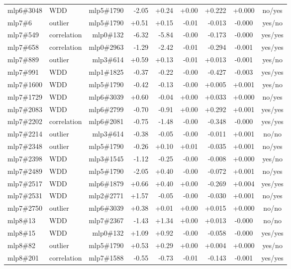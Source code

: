 \begin{center}
\begin{longtable}{llrrrrrcc}
mlp6\#3048 & WDD & mlp5\#1790 & -2.05 & +0.24 & +0.00 & +0.222 & +0.000 & no/yes \\
mlp7\#6 & outlier & mlp5\#1790 & +0.51 & +0.15 & -0.01 & -0.013 & -0.000 & yes/no \\
mlp7\#549 & correlation & mlp0\#132 & -6.32 & -5.84 & -0.00 & -0.173 & -0.000 & yes/yes \\
mlp7\#658 & correlation & mlp0\#2963 & -1.29 & -2.42 & -0.01 & -0.294 & -0.001 & yes/yes \\
mlp7\#889 & outlier & mlp3\#614 & +0.59 & +0.13 & -0.01 & +0.013 & -0.001 & yes/no \\
mlp7\#991 & WDD & mlp1\#1825 & -0.37 & -0.22 & -0.00 & -0.427 & -0.003 & yes/yes \\
mlp7\#1600 & WDD & mlp5\#1790 & -0.42 & -0.13 & -0.00 & +0.005 & +0.001 & yes/no \\
mlp7\#1729 & WDD & mlp6\#3039 & +0.60 & -0.04 & +0.00 & +0.033 & +0.000 & no/yes \\
mlp7\#2083 & WDD & mlp6\#2799 & -0.70 & -0.91 & +0.00 & +0.292 & +0.001 & yes/yes \\
mlp7\#2202 & correlation & mlp6\#2081 & -0.75 & -1.48 & -0.00 & -0.348 & -0.000 & yes/yes \\
mlp7\#2214 & outlier & mlp3\#614 & -0.38 & -0.05 & -0.00 & -0.011 & +0.001 & no/no \\
mlp7\#2348 & outlier & mlp5\#1790 & -0.26 & +0.10 & +0.01 & -0.035 & +0.001 & no/yes \\
mlp7\#2398 & WDD & mlp3\#1545 & -1.12 & -0.25 & -0.00 & -0.008 & +0.000 & yes/no \\
mlp7\#2489 & WDD & mlp5\#1790 & -2.05 & +0.40 & -0.00 & -0.072 & +0.001 & no/yes \\
mlp7\#2517 & WDD & mlp6\#1879 & +0.66 & +0.40 & +0.00 & -0.269 & +0.004 & yes/yes \\
mlp7\#2531 & WDD & mlp2\#2771 & +1.57 & -0.05 & -0.00 & -0.030 & +0.001 & no/yes \\
mlp7\#2750 & outlier & mlp6\#3039 & +0.38 & +0.01 & +0.00 & +0.015 & +0.000 & no/no \\
mlp8\#13 & WDD & mlp7\#2367 & -1.43 & +1.34 & +0.00 & +0.013 & -0.000 & no/no \\
mlp8\#15 & WDD & mlp0\#132 & +1.09 & +0.92 & -0.00 & -0.058 & -0.000 & yes/yes \\
mlp8\#82 & outlier & mlp5\#1790 & +0.53 & +0.29 & +0.00 & +0.004 & +0.000 & yes/no \\
mlp8\#201 & correlation & mlp7\#1588 & -0.55 & -0.73 & -0.01 & -0.143 & -0.001 & yes/yes \\

\end{longtable}
\end{center}
